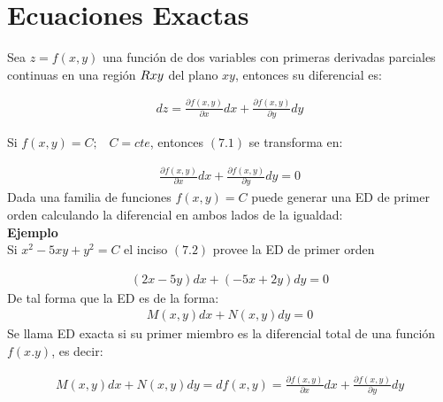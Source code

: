 \chapter{Ecuaciones Exactas}

Sea \(\displaystyle z=f(x,y)\) una función de dos variables con primeras derivadas parciales continuas en una región \(\displaystyle R\tiny{xy}\) del plano \(\displaystyle xy\), entonces su diferencial es:

\begin{equation}
    \begin{gathered}
        dz=\frac{\partial{f(x,y)}}{\partial{x}}dx+\frac{\partial{f(x,y)}}{\partial{y}}dy
    \end{gathered}
\end{equation}

Si \(\displaystyle f(x,y)=C;\;\;\;C=cte\), entonces \(\displaystyle (7.1)\) se transforma en:

\begin{equation}
    \begin{gathered}
        \frac{\partial{f(x,y)}}{\partial{x}}dx+\frac{\partial{f(x,y)}}{\partial{y}}dy=0
    \end{gathered}
\end{equation}
Dada una familia de funciones \(\displaystyle f(x,y)=C\) puede generar una ED de primer orden calculando la diferencial en ambos lados de la igualdad:\\

\textbf{Ejemplo}\\

Si \(\displaystyle x^{2}-5xy+y^{2}=C\) el inciso \(\displaystyle (7.2)\) provee la ED de primer orden

\begin{equation*}
    \begin{gathered}
        (2x-5y)dx+(-5x+2y)dy=0
    \end{gathered}
\end{equation*}
De tal forma que la ED es de la forma:
\begin{equation}
    \begin{gathered}
        M(x,y)dx+N(x,y)dy=0
    \end{gathered}
\end{equation}
Se llama ED exacta si su primer miembro es la diferencial total de una función \(\displaystyle f(x.y)\), es decir:

\begin{equation*}
    \begin{gathered}
        M(x,y)dx+N(x,y)dy=df(x,y)=\frac{\partial{f(x,y)}}{\partial{x}}dx+\frac{\partial{f(x,y)}}{\partial{y}}dy
    \end{gathered}
\end{equation*}

